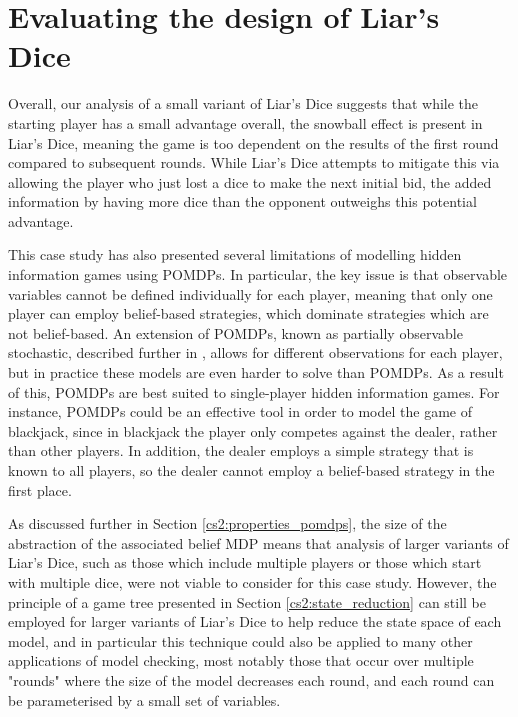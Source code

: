 \section{Evaluating the design of Liar's Dice}
\label{cs2:evaluation}

Overall, our analysis of a small variant of Liar's Dice suggests that while the starting player has a small advantage overall, the snowball effect is present in Liar's Dice, meaning the game is too dependent on the results of the first round compared to subsequent rounds. While Liar's Dice attempts to mitigate this via allowing the player who just lost a dice to make the next initial bid, the added information by having more dice than the opponent outweighs this potential advantage.

This case study has also presented several limitations of modelling hidden information games using POMDPs. In particular, the key issue is that observable variables cannot be defined individually for each player, meaning that only one player can employ belief-based strategies, which dominate strategies which are not belief-based. An extension of POMDPs, known as partially observable stochastic, described further in \cite{hansen_dynamic_nodate}, allows for different observations for each player, but in practice these models are even harder to solve than POMDPs. As a result of this, POMDPs are best suited to single-player hidden information games. For instance, POMDPs could be an effective tool in order to model the game of blackjack, since in blackjack the player only competes against the dealer, rather than other players. In addition, the dealer employs a simple strategy that is known to all players, so the dealer cannot employ a belief-based strategy in the first place.

As discussed further in Section \ref{cs2:properties_pomdps}, the size of the abstraction of the associated belief MDP means that analysis of larger variants of Liar's Dice, such as those which include multiple players or those which start with multiple dice, were not viable to consider for this case study. However, the principle of a game tree presented in Section \ref{cs2:state_reduction} can still be employed for larger variants of Liar's Dice to help reduce the state space of each model, and in particular this technique could also be applied to many other applications of model checking, most notably those that occur over multiple "rounds" where the size of the model decreases each round, and each round can be parameterised by a small set of variables.

